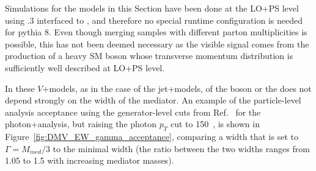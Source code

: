 


Simulations for the models in this Section have been done at the LO+PS level using  .3 interfaced to \pythiaEight, 
and therefore no special runtime configuration is needed for pythia 8. Even though merging samples with different parton multiplicities is possible,  this has not been deemed necessary as the visible signal comes from the production of a heavy SM boson whose transverse momentum distribution is sufficiently well described at LO+PS level. 

In these $V$+\MET models, as in the case of the jet+\MET models, \pT of the boson or the \MET does not depend 
strongly on the width of the mediator. An example of the particle-level analysis acceptance using the
generator-level cuts from Ref.~\cite{Aad:2014tda}
for the photon+\MET analysis, but raising the photon $p_T$ cut
to 150~\gev, is shown in Figure~\ref{fig:DMV_EW_gamma_acceptance},
comparing a width that is set to $\Gamma=M_{med}/3$ to the
minimal width (the ratio between the two widths
ranges from 1.05 to 1.5 with increasing mediator masses).

